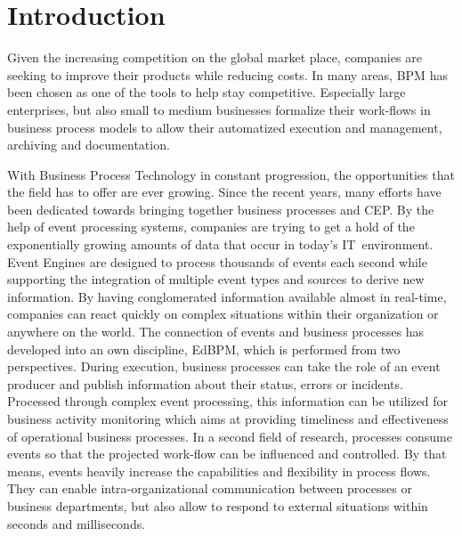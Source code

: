 \chapter{Introduction}

Given the increasing competition on the global market place, companies are seeking to improve their products while reducing costs.
In many areas, \ac{BPM} has been chosen as one of the tools to help stay competitive.
Especially large enterprises, but also small to medium businesses formalize their work-flows in business process models to allow their automatized execution and management, archiving and documentation.


With Business Process Technology in constant progression, the opportunities that the field has to offer are ever growing.
Since the recent years, many efforts have been dedicated towards bringing together business processes and \ac{CEP}.
By the help of event processing systems, companies are trying to get a hold of the exponentially growing amounts of data that occur in today's IT~environment.
Event Engines are designed to process thousands of events each second while supporting the integration of multiple event types and sources to derive new information.
By having conglomerated information available almost in real-time, companies can react quickly on complex situations within their organization or anywhere on the world.
The connection of events and business processes has developed into an own discipline, \acl{EdBPM}, which is performed from two perspectives.
During execution, business processes can take the role of an event producer and publish information about their status, errors or incidents. 
Processed through complex event processing, this information can be utilized for business activity monitoring which aims at providing timeliness and effectiveness of operational business processes.
In a second field of research, processes consume events so that the projected work-flow can be influenced and controlled.
By that means, events heavily increase the capabilities and flexibility in process flows. They can enable intra-organizational communication between processes or business departments, but also allow to respond to external situations within seconds and milliseconds.

